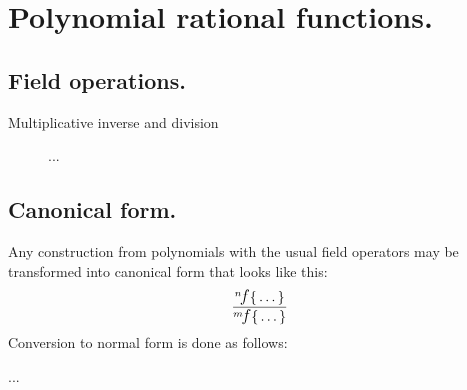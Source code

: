 \section{ Polynomial rational functions. }

\subsection{ Field operations. }

\begin{description}
    \item [Multiplicative inverse and division] ...

\end{description}


\subsection{ Canonical form. }

Any construction from polynomials with the usual field operators may be transformed into canonical
form that looks like this:
$$ \frac{\f{n}{\dots}}{\f{m}{\dots}} $$
Conversion to normal form is done as follows:

...
